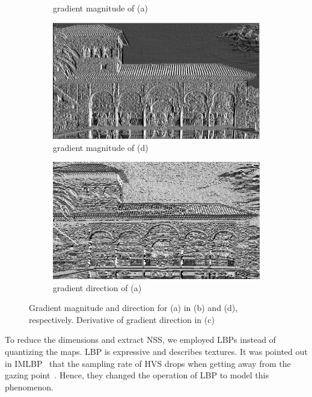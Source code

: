 \begin{figure}
\begin{subfigure}[b]{0.24\textwidth}
         \caption{gradient magnitude of (a)}
         \label{}
     \end{subfigure}
     \hfill
     \begin{subfigure}[b]{0.24\textwidth}
         \centering
         \includegraphics[width= \textwidth]{./figs/mm_dir}
         \caption{gradient magnitude of (d)}
         \label{}
     \end{subfigure}
     \hfill
     \begin{subfigure}[b]{0.24\textwidth}
         \centering
         \includegraphics[width= \textwidth]{./figs/dir_ref}
         \caption{gradient direction of (a)}
         \label{}
     \end{subfigure}
     \caption{Gradient magnitude and direction for (a) in (b) and (d), respectively. Derivative of gradient direction in (c)}
        \label{fig:mg_dir}
\end{figure}

To reduce the dimensions and extract NSS, we employed LBPs instead of quantizing the maps. LBP is expressive and describes textures. It was pointed out in IMLBP~\cite{Yue2018} that the sampling rate of HVS drops when getting away from the gazing point~\cite{Pelli2008}. Hence, they changed the operation of LBP to model this phenomenon.

